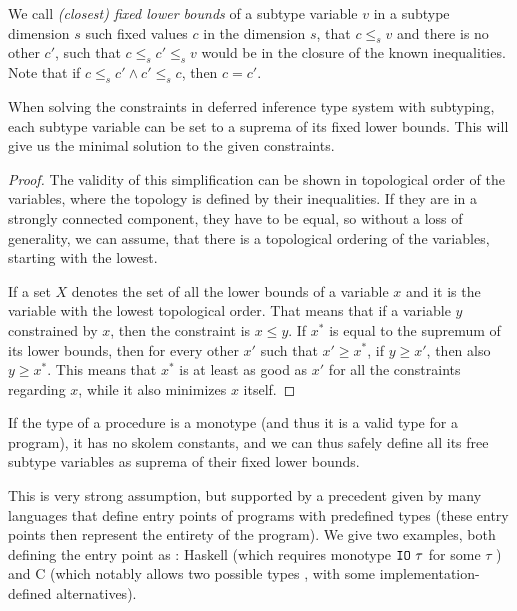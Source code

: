 We call \emph{(closest) fixed lower bounds} of a subtype variable $v$ in a subtype dimension $s$ such fixed values $c$ in the dimension $s$, that $c \leq_s v$ and there is no other $c'$, such that $c \leq_s c' \leq_s v$ would be in the closure of the known inequalities. Note that if $c \leq_s c' \land c' \leq_s c$, then $c = c'$.

\begin{lemma} When solving the constraints in deferred inference type system with subtyping, each subtype variable can be set to a suprema of its fixed lower bounds. This will give us the minimal solution to the given constraints.
    \label{suprema_subtyping}

    \begin{proof}
        The validity of this simplification can be shown in topological order of the variables, where the topology is defined by their inequalities. If they are in a strongly connected component, they have to be equal, so without a loss of generality, we can assume, that there is a topological ordering of the variables, starting with the lowest.

        If a set $X$ denotes the set of all the lower bounds of a variable $x$ and it is the variable with the lowest topological order. That means that if a variable $y$ constrained by $x$, then the constraint is $x \leq y$. If $x^\ast$ is equal to the supremum of its lower bounds, then for every other $x'$ such that $x' \geq x^\ast$, if $y \geq x'$, then also $y \geq x^\ast$. This means that $x^\ast$ is at least as good as $x'$ for all the constraints regarding $x$, while it also minimizes $x$ itself.
    \end{proof}

\end{lemma}

\begin{observe}
    If the type of a procedure is a monotype (and thus it is a valid type for a program), it has no skolem constants, and we can thus safely define all its free subtype variables as suprema of their fixed lower bounds.
\end{observe}

This is very strong assumption, but supported by a precedent given by many languages that define entry points of programs with predefined types (these entry points then represent the entirety of the program). We give two examples, both defining the entry point as : Haskell (which requires monotype $\mathtt{IO}\ \tau$ for some $\tau$ \cite{haskell2010}) and C (which notably allows two possible types \cite{cstandard2018}, with some implementation-defined alternatives).

